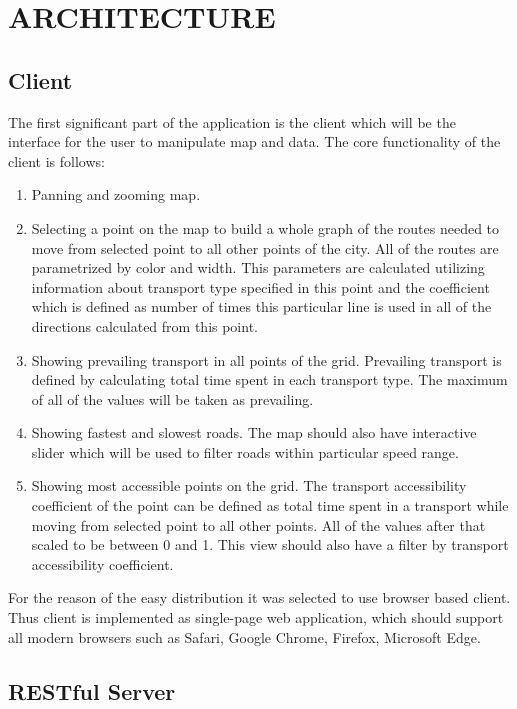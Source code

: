 
\section{ ARCHITECTURE }
\subsection{ Client }

The first significant part of the application is the client which will
be the interface for the user to manipulate map and data. The core functionality of the client
is follows:

\begin{enumerate}
  \item Panning and zooming map.
  \item Selecting a point on the map to build a whole graph of
  the routes needed to move from selected point to all other points of the city. All of the routes
  are parametrized by color and width. This parameters are calculated utilizing information
  about transport type specified in this point and the coefficient which is defined as number of
  times this particular line is used in all of the directions calculated from this point.
  \item Showing prevailing transport in all points of the grid. Prevailing transport is defined
  by calculating total time spent in each transport type. The maximum of all of the values will
  be taken as prevailing.
  \item Showing fastest and slowest roads. The map should also have interactive slider
  which will be used to filter roads within particular speed range.
  \item Showing most accessible points on the grid. The transport accessibility coefficient of the
  point can be defined as total time spent in a transport while moving from selected point to all
  other points. All of the values after that scaled to be between 0 and 1. This view should also
  have a filter by transport accessibility coefficient.
\end{enumerate}

For the reason of the easy distribution it was selected to use browser based client. Thus
client is implemented as single-page web application, which should support all modern browsers such
as Safari, Google Chrome, Firefox, Microsoft Edge.

\subsection{ RESTful Server }

